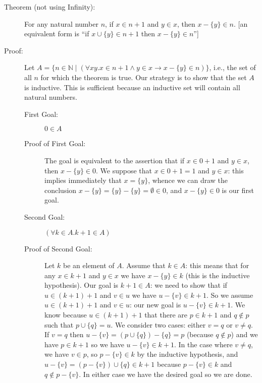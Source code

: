 \documentclass[12pt]{book}
\begin{document}
\begin{description}

\item[Theorem (not using Infinity):] For any natural number $n$, if $x
\in n+1$ and $y \in x$, then $x-\{y\} \in n$.  [an equivalent form is
``if $x \cup \{y\} \in n+1$ then $x-\{y\} \in n$'']

\item[Proof:] Let $A = \{n \in {\mathbb N}\mid (\forall xy.x\in n+1
\wedge y \in x \rightarrow x-\{y\} \in n)\}$, i.e., the set of all $n$
for which the theorem is true.  Our strategy is to show that the set
$A$ is inductive.  This is sufficient because an inductive set will
contain all natural numbers.

\begin{description}

\item[First Goal:]  $0 \in A$

\item[Proof of First Goal:]

The goal is equivalent to the assertion that if $x \in 0+1$ and $y \in
x$, then $x-\{y\} \in 0$.  We suppose that $x \in 0+1 = 1$ and $y \in
x$: this implies immediately that $x=\{y\}$, whence we can draw the
conclusion $x-\{y\} = \{y\}-\{y\} = \emptyset \in 0$, and $x-\{y\} \in
0$ is our first goal.

\item[Second Goal:]  $(\forall k \in A.k+1 \in A)$

\item[Proof of Second Goal:]

Let $k$ be an element of $A$.  Assume that $k \in A$: this means that
for any $x \in k+1$ and $y \in x$ we have $x-\{y\} \in k$ (this is the
inductive hypothesis).  Our goal is $k+1 \in A$: we need to show that
if $u\in (k+1)+1$ and $v \in u$ we have $u-\{v\} \in k+1$.  So we
assume $u \in (k+1)+1$ and $v \in u$: our new goal is $u - \{v\} \in
k+1$.  We know because $u \in (k+1)+1$ that there are $p \in k+1$ and
$q \not\in p$ such that $p \cup \{q\} = u$.  We consider two cases:
either $v=q$ or $v \neq q$.  If $v=q$ then $u-\{v\} = (p \cup
\{q\})-\{q\} = p$ (because $q \not\in p$) and we have $p \in k+1$ so we
have $u -\{v\} \in k+1$.  In the case where $v \neq q$, we have $v \in
p$, so $p -\{v\} \in k$ by the inductive hypothesis, and $u-\{v\} =
(p-\{v\}) \cup \{q\} \in k+1$ because $p-\{v\} \in k$ and $q \not\in
p-\{v\}$.  In either case we have the desired goal so we are done.


\end{description}
\end{description}
\end{document}
